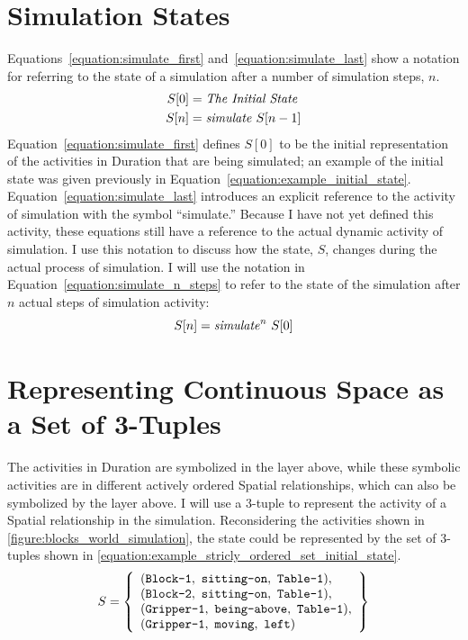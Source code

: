 \section{Simulation States}

Equations~\ref{equation:simulate_first}
and~\ref{equation:simulate_last} show a notation for referring to the
state of a simulation after a number of simulation steps, $n$.
\begin{align}
\label{equation:simulate_first}
S[0] &= \text{\emph{The Initial State}} \\
\label{equation:simulate_last}
S[n] &= \text{\emph{simulate}}~S[n-1]
\end{align}
Equation~\ref{equation:simulate_first} defines $S[0]$ to be
the initial representation of the activities in Duration that are
being simulated; an example of the initial state was given previously
in Equation~\ref{equation:example_initial_state}.
Equation~\ref{equation:simulate_last} introduces an explicit reference
to the activity of simulation with the symbol ``simulate.''  Because I
have not yet defined this activity, these equations still have a
reference to the actual dynamic activity of simulation.  I use this
notation to discuss how the state, $S$, changes during the
actual process of simulation.  I will use the notation in
Equation~\ref{equation:simulate_n_steps} to refer to the state of the
simulation after $n$ actual steps of simulation activity:
\begin{equation}
\label{equation:simulate_n_steps}
S[n] = \text{\emph{simulate}}^n~S[0]
\end{equation}

\section{Representing Continuous Space as a Set of 3-Tuples}

The activities in Duration are symbolized in the layer above, while
these symbolic activities are in different actively ordered Spatial
relationships, which can also be symbolized by the layer above.  I
will use a 3-tuple to represent the activity of a Spatial relationship
in the simulation.  Reconsidering the activities shown in
{\mbox{\autoref{figure:blocks_world_simulation}}}, the state could be
represented by the set of 3-tuples shown in
{\mbox{\autoref{equation:example_stricly_ordered_set_initial_state}}}.
\begin{equation}
\label{equation:example_stricly_ordered_set_initial_state}
S =
  \left\{
    \begin{array}{l}
      (\text{\tt{Block-1}},   ~\text{\tt{sitting-on}},  ~\text{\tt{Table-1}}), \\
      (\text{\tt{Block-2}},   ~\text{\tt{sitting-on}},  ~\text{\tt{Table-1}}), \\
      (\text{\tt{Gripper-1}}, ~\text{\tt{being-above}}, ~\text{\tt{Table-1}}), \\
      (\text{\tt{Gripper-1}}, ~\text{\tt{moving}},      ~\text{\tt{left}})
    \end{array}
  \right\}
\end{equation}

